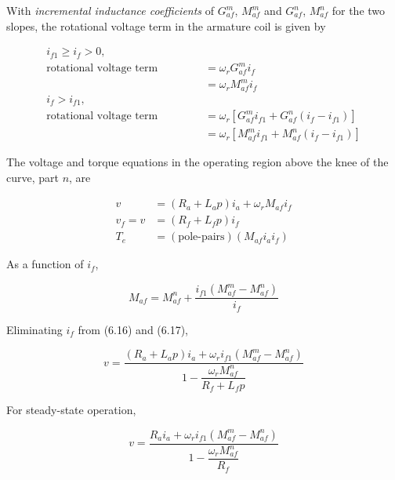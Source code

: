 \documentclass[a4paper,numbers=noenddot,12pt]{scrbook}
\begin{document}
        With \textit{incremental inductance coefficients} of $G_{af}^m$, $M_{af}^m$ and $G_{af}^n$, $M_{af}^n$ for the two slopes, the rotational voltage term in the armature coil is given by

        \begin{align*}
            i_{f1} \geq i_f > 0, \hspace{8em}\\
            \text{rotational voltage term} & =\omega_r G_{af}^m i_f \\
            & = \omega_r M_{af}^m i_f\\
            i_f > i_{f1}, \hspace{10em} &\\
            \text{rotational voltage term} & = \omega_r [G_{af}^m i_{f1} + G_{af}^n (i_f - i_{f1})] \\
            &=  \omega_r [M_{af}^m i_{f1} + M_{af}^n (i_f - i_{f1})]
        \end{align*}

        The voltage and torque equations in the operating region above the knee of the curve, part $n$, are

        \begin{align}
            v & = (R_a + L_a p)i_a + \omega_r M_{af} i_f \\
            v_f = v & = (R_f + L_f p) i_f\\
            T_e & = (\text{pole-pairs})(M_{af} i_a i_f)
            \label{}
        \end{align}

        As a function of $i_f$,

        \begin{equation*}
            M_{af} = M_{af}^n + \frac{i_{f1}(M_{af}^m - M_{af}^n)}{i_f}
        \end{equation*}

        Eliminating $i_f$ from (6.16) and (6.17),

        \begin{equation}
            v = \frac{(R_a + L_a p) i_a + \omega_r i_{f1} (M_{af}^m - M_{af}^n)}{1 - \dfrac{\omega_r M_{af}^n}{R_f + L_f p}} 
            \label{}
        \end{equation}

        For steady-state operation,

        \begin{equation}
            v = \frac{R_a i_a + \omega_r i_{f1}(M_{af}^m - M_{af}^n)}{1 - \dfrac{\omega_r M_{af}^n}{R_f}}
            \label{}
        \end{equation}
\end{document}
